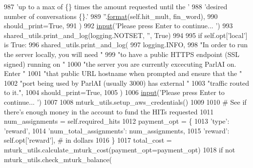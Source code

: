 \begin{DoxyCode}
987                 \textcolor{stringliteral}{'up to a max of \{\} times the amount requested until the '}
988                 \textcolor{stringliteral}{'desired number of conversations \{\}.'}
989                 \textcolor{stringliteral}{''}.\hyperlink{namespaceparlai_1_1chat__service_1_1services_1_1messenger_1_1shared__utils_a32e2e2022b824fbaf80c747160b52a76}{format}(self.hit\_mult, fin\_word),
990                 should\_print=\textcolor{keyword}{True},
991             )
992         \hyperlink{namespaceparlai_1_1mturk_1_1core_1_1dev_1_1test_1_1test__full__system_a1e1817cd65688fb90f827834d1fb4567}{input}(\textcolor{stringliteral}{'Please press Enter to continue... '})
993         shared\_utils.print\_and\_log(logging.NOTSET, \textcolor{stringliteral}{''}, \textcolor{keyword}{True})
994 
995         \textcolor{keywordflow}{if} self.opt[\textcolor{stringliteral}{'local'}] \textcolor{keywordflow}{is} \textcolor{keyword}{True}:
996             shared\_utils.print\_and\_log(
997                 logging.INFO,
998                 \textcolor{stringliteral}{"In order to run the server locally, you will need "}
999                 \textcolor{stringliteral}{"to have a public HTTPS endpoint (SSL signed) running on "}
1000                 \textcolor{stringliteral}{"the server you are currently excecuting ParlAI on. Enter "}
1001                 \textcolor{stringliteral}{"that public URL hostname when prompted and ensure that the "}
1002                 \textcolor{stringliteral}{"port being used by ParlAI (usually 3000) has external "}
1003                 \textcolor{stringliteral}{"traffic routed to it."},
1004                 should\_print=\textcolor{keyword}{True},
1005             )
1006             \hyperlink{namespaceparlai_1_1mturk_1_1core_1_1dev_1_1test_1_1test__full__system_a1e1817cd65688fb90f827834d1fb4567}{input}(\textcolor{stringliteral}{'Please press Enter to continue... '})
1007 
1008         mturk\_utils.setup\_aws\_credentials()
1009 
1010         \textcolor{comment}{# See if there's enough money in the account to fund the HITs requested}
1011         num\_assignments = self.required\_hits
1012         payment\_opt = \{
1013             \textcolor{stringliteral}{'type'}: \textcolor{stringliteral}{'reward'},
1014             \textcolor{stringliteral}{'num\_total\_assignments'}: num\_assignments,
1015             \textcolor{stringliteral}{'reward'}: self.opt[\textcolor{stringliteral}{'reward'}],  \textcolor{comment}{# in dollars}
1016         \}
1017         total\_cost = mturk\_utils.calculate\_mturk\_cost(payment\_opt=payment\_opt)
1018         \textcolor{keywordflow}{if} \textcolor{keywordflow}{not} mturk\_utils.check\_mturk\_balance(

\end{DoxyCode}

